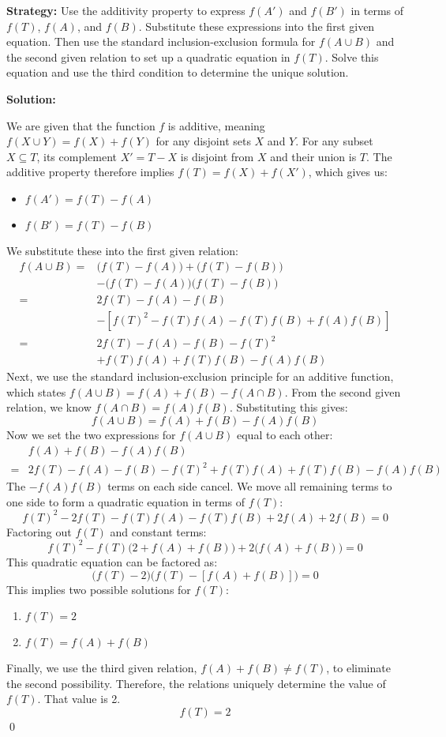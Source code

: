 \noindent\textbf{Strategy:} Use the additivity property to express $f(A')$ and $f(B')$ in terms of $f(T)$, $f(A)$, and $f(B)$. Substitute these expressions into the first given equation. Then use the standard inclusion-exclusion formula for $f(A \cup B)$ and the second given relation to set up a quadratic equation in $f(T)$. Solve this equation and use the third condition to determine the unique solution.

\bigskip\noindent\textbf{Solution:}

We are given that the function \(f\) is additive, meaning \(f(X \cup Y) = f(X) + f(Y)\) for any disjoint sets \(X\) and \(Y\). For any subset \(X \subseteq T\), its complement \(X' = T - X\) is disjoint from \(X\) and their union is \(T\). The additive property therefore implies \(f(T) = f(X) + f(X')\), which gives us:
\begin{itemize}
\item \(f(A') = f(T) - f(A)\)
\item \(f(B') = f(T) - f(B)\)
\end{itemize}
We substitute these into the first given relation:
\begin{align*}
f(A \cup B) =& \big(f(T) - f(A)\big) + \big(f(T) - f(B)\big) \\
&- \big(f(T) - f(A)\big)\big(f(T) - f(B)\big) \\
=& 2f(T) - f(A) - f(B)  \\
&- \left[ f(T)^2 - f(T)f(A) - f(T)f(B) + f(A)f(B) \right] \\
=& 2f(T) - f(A) - f(B) - f(T)^2 \\
&+ f(T)f(A) + f(T)f(B) - f(A)f(B)
\end{align*}
Next, we use the standard inclusion-exclusion principle for an additive function, which states \(f(A \cup B) = f(A) + f(B) - f(A \cap B)\). From the second given relation, we know \(f(A \cap B) = f(A)f(B)\). Substituting this gives:
\[
f(A \cup B) = f(A) + f(B) - f(A)f(B)
\]
Now we set the two expressions for \(f(A \cup B)\) equal to each other:
\begin{align*}
&f(A) + f(B) - f(A)f(B) \\
=& 2f(T) - f(A) - f(B) - f(T)^2 + f(T)f(A) + f(T)f(B) - f(A)f(B)
\end{align*}
The \( -f(A)f(B) \) terms on each side cancel. We move all remaining terms to one side to form a quadratic equation in terms of \(f(T)\):
\[
f(T)^2 - 2f(T) - f(T)f(A) - f(T)f(B) + 2f(A) + 2f(B) = 0
\]
Factoring out \(f(T)\) and constant terms:
\[
f(T)^2 - f(T)\big(2 + f(A) + f(B)\big) + 2\big(f(A) + f(B)\big) = 0
\]
This quadratic equation can be factored as:
\[
\big(f(T) - 2\big) \big(f(T) - [f(A) + f(B)]\big) = 0
\]
This implies two possible solutions for \(f(T)\):
\begin{enumerate}
\item \(f(T) = 2\)
\item \(f(T) = f(A) + f(B)\)
\end{enumerate}
Finally, we use the third given relation, \(f(A) + f(B) \ne f(T)\), to eliminate the second possibility.
Therefore, the relations uniquely determine the value of \(f(T)\). That value is 2.
\[
\boxed{f(T) = 2}
\]\qed